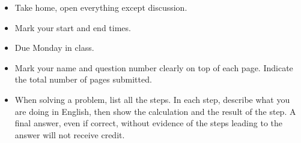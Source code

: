 \begin{itemize}
\item Take home, open everything except discussion.
\item Mark your start and end times. %
\item Due Monday in class.
\item Mark your name and question number clearly on top of each page.
	Indicate the total number of pages submitted.
\item When solving a problem, list all the steps. In each step, describe 
	what you are doing in English, then show the calculation and the 
	result of the step. A final answer, even if correct, without 
	evidence of the steps leading to the answer will not receive credit.
\end{itemize}

